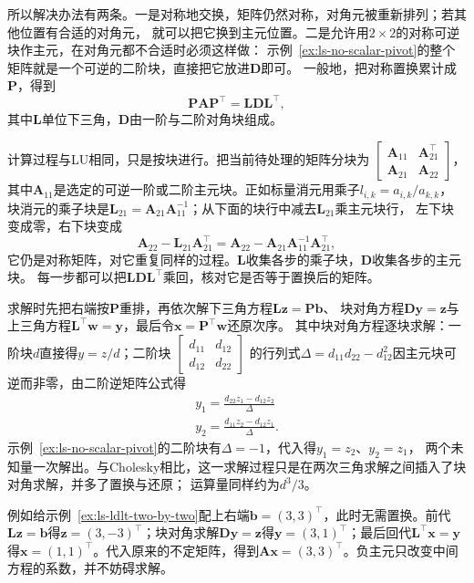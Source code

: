 所以解决办法有两条。一是对称地交换，矩阵仍然对称，对角元被重新排列；若其他位置有合适的对角元，
就可以把它换到主元位置。二是允许用$2\times2$的对称可逆块作主元，在对角元都不合适时必须这样做：
示例~\ref{ex:ls-no-scalar-pivot}的整个矩阵就是一个可逆的二阶块，直接把它放进$\bm D$即可。
一般地，把对称置换累计成$\bm P$，得到
\[
 \bm P\bm A\bm P^\top=\bm L\bm D\bm L^\top,
\]
其中$\bm L$单位下三角，$\bm D$由一阶与二阶对角块组成。

计算过程与LU相同，只是按块进行。把当前待处理的矩阵分块为
$\left[\begin{smallmatrix}\bm A_{11}&\bm A_{21}^\top\\\bm A_{21}&\bm A_{22}\end{smallmatrix}\right]$，
其中$\bm A_{11}$是选定的可逆一阶或二阶主元块。正如标量消元用乘子$l_{i,k}=a_{i,k}/a_{k,k}$，
块消元的乘子块是$\bm L_{21}=\bm A_{21}\bm A_{11}^{-1}$；从下面的块行中减去$\bm L_{21}$乘主元块行，
左下块变成零，右下块变成
\[
 \bm A_{22}-\bm L_{21}\bm A_{21}^\top=\bm A_{22}-\bm A_{21}\bm A_{11}^{-1}\bm A_{21}^\top ,
\]
它仍是对称矩阵，对它重复同样的过程。$\bm L$收集各步的乘子块，$\bm D$收集各步的主元块。
每一步都可以把$\bm L\bm D\bm L^\top$乘回，核对它是否等于置换后的矩阵。

求解时先把右端按$\bm P$重排，再依次解下三角方程$\bm L\bm z=\bm P\bm b$、
块对角方程$\bm D\bm y=\bm z$与上三角方程$\bm L^\top\bm w=\bm y$，最后令$\bm x=\bm P^\top\bm w$还原次序。
其中块对角方程逐块求解：一阶块$d$直接得$y=z/d$；二阶块
$\left[\begin{smallmatrix}d_{11}&d_{12}\\d_{12}&d_{22}\end{smallmatrix}\right]$
的行列式$\Delta=d_{11}d_{22}-d_{12}^2$因主元块可逆而非零，由二阶逆矩阵公式得
\begin{equation}
\begin{gathered}
y_1=\frac{d_{22}z_1-d_{12}z_2}{\Delta}\\
y_2=\frac{d_{11}z_2-d_{12}z_1}{\Delta}.
\end{gathered}
\end{equation}
示例~\ref{ex:ls-no-scalar-pivot}的二阶块有$\Delta=-1$，代入得$y_1=z_2$、$y_2=z_1$，
两个未知量一次解出。与Cholesky相比，这一求解过程只是在两次三角求解之间插入了块对角求解，并多了置换与还原；
运算量同样约为$d^3/3$。

例如给示例~\ref{ex:ls-ldlt-two-by-two}配上右端$\bm b=(3,3)^\top$，此时无需置换。前代$\bm L\bm z=\bm b$得$\bm z=(3,-3)^\top$；块对角求解$\bm D\bm y=\bm z$得$\bm y=(3,1)^\top$；最后回代$\bm L^\top\bm x=\bm y$得$\bm x=(1,1)^\top$。代入原来的不定矩阵，得到$\bm A\bm x=(3,3)^\top$。负主元只改变中间方程的系数，并不妨碍求解。

